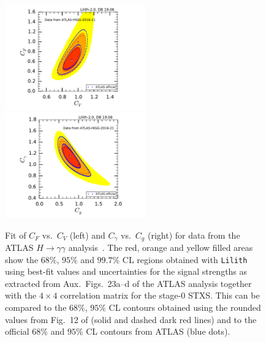 \begin{figure}[h!]\centering
\includegraphics[width=0.54\textwidth]{validation/ATLAS/HIGG-2016-21-CVCF.pdf}%
\hspace{-13mm}\includegraphics[width=0.54\textwidth]{validation/ATLAS/HIGG-2016-21-CgCGa.pdf}%
\vspace*{-2mm}
\caption{Fit of $C_F$ vs.\ $C_V$ (left) and $C_\gamma$ vs.\ $C_g$ (right) for data from the ATLAS $H\to\gamma\gamma$ analysis~\cite{Aaboud:2018xdt}. The red, orange and yellow filled areas show the 
$68\%$,  $95\%$ and $99.7\%$ CL regions obtained with {\tt Lilith} using best-fit values and uncertainties for the signal strengths 
as extracted from Aux.\ Figs.~23a--d of the ATLAS analysis together with the $4\times 4$ correlation matrix for the stage-0 STXS. 
This can be compared to the $68\%$,  $95\%$ CL contours obtained using the rounded values from Fig.~12 of \cite{Sirunyan:2018koj} 
(solid and dashed dark red lines) and to the official $68\%$ and $95\%$ CL contours from ATLAS (blue dots).}
\label{fig:validation_atlas_gamgam}
\end{figure}
 

